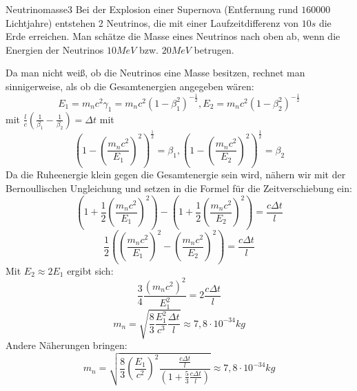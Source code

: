 

\begin{problem}{Neutrinomasse}{3}
Bei der Explosion einer Supernova (Entfernung rund $160000$ Lichtjahre) entstehen 2 Neutrinos, die mit einer Laufzeitdifferenz von $10\unit{s}$ die Erde erreichen. Man schätze die Masse eines Neutrinos nach oben ab, wenn die Energien der Neutrinos $10\unit{MeV}$ bzw. $20\unit{MeV}$ betrugen.
\begin{solution}
Da man nicht weiß, ob die Neutrinos eine Masse besitzen, rechnet man sinnigerweise, als ob die Gesamtenergien angegeben wären:
$$E_1=m_nc^2\gamma_1=m_nc^2\left(1-\beta_1^2\right)^{-\frac 12}, E_2= m_nc^2\left(1-\beta_2^2\right)^{-\frac 12}$$
mit $\frac lc\left(\frac 1{\beta_1}-\frac 1{\beta_2}\right)=\Delta t$
mit 
$$\left(1-\left(\frac{m_nc^2}{E_1}\right)^2\right)^{\frac 12}=\beta_1, \left(1-\left(\frac{m_nc^2}{E_2}\right)^2\right)^{\frac 12}=\beta_2$$
Da die Ruheenergie klein gegen die Gesamtenergie sein wird, nähern wir mit der Bernoullischen Ungleichung und setzen in die Formel für die Zeitverschiebung ein:
$$\left(1+\frac 12\left(\frac{m_nc^2}{E_1}\right)^2\right)-\left(1+\frac 12\left(\frac{m_nc^2}{E_2}\right)^2\right)=\frac{c\Delta t}{l}$$
$$\frac 12\left(\left(\frac{m_nc^2}{E_1}\right)^2-\left(\frac{m_nc^2}{E_2}\right)^2\right)=\frac{c\Delta t}{l}$$
Mit $E_2\approx 2E_1$ ergibt sich:
$$\frac 34\frac{(m_nc^2)^2}{E_1^2}=2\frac{c\Delta t}l$$
$$m_n=\sqrt{\frac 83 \frac{E_1^2}{c^3}\frac{\Delta t}{l} }\approx 7,8\cdot 10^{-34}\unit{kg}$$
Andere Näherungen bringen:
$$m_n=\sqrt{\frac 83\left(\frac{E_1}{c^2}\right)^2\frac{\frac{c\Delta t}l}{\left( 1+\frac 53 \frac{c\Delta t}{l}\right)}}\approx 7,8\cdot 10^{-34}\unit{kg}$$
\end{solution}
\end{problem}

